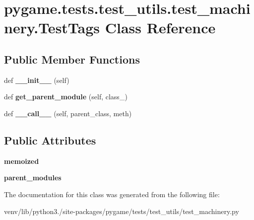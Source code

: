\hypertarget{classpygame_1_1tests_1_1test__utils_1_1test__machinery_1_1_test_tags}{}\section{pygame.\+tests.\+test\+\_\+utils.\+test\+\_\+machinery.\+Test\+Tags Class Reference}
\label{classpygame_1_1tests_1_1test__utils_1_1test__machinery_1_1_test_tags}
\subsection*{Public Member Functions}
\begin{DoxyCompactItemize}
\item 
\mbox{\label{classpygame_1_1tests_1_1test__utils_1_1test__machinery_1_1_test_tags_a28c58f291cf0f58356577d0dc758eddb}} 
def {\bfseries \+\_\+\+\_\+init\+\_\+\+\_\+} (self)
\item 
\mbox{\label{classpygame_1_1tests_1_1test__utils_1_1test__machinery_1_1_test_tags_a688fc9a730cfe9c6c365f7ddff668712}} 
def {\bfseries get\+\_\+parent\+\_\+module} (self, class\+\_\+)
\item 
\mbox{\label{classpygame_1_1tests_1_1test__utils_1_1test__machinery_1_1_test_tags_a5ff73d1561fee249f1628d02fa3d2cb7}} 
def {\bfseries \+\_\+\+\_\+call\+\_\+\+\_\+} (self, parent\+\_\+class, meth)
\end{DoxyCompactItemize}
\subsection*{Public Attributes}
\begin{DoxyCompactItemize}
\item 
\mbox{\label{classpygame_1_1tests_1_1test__utils_1_1test__machinery_1_1_test_tags_a556b10489a5a440b0b2b0f4a94348add}} 
{\bfseries memoized}
\item 
\mbox{\label{classpygame_1_1tests_1_1test__utils_1_1test__machinery_1_1_test_tags_a06731fadb8907d00eeea65e02019dc53}} 
{\bfseries parent\+\_\+modules}
\end{DoxyCompactItemize}


The documentation for this class was generated from the following file\+:\begin{DoxyCompactItemize}
\item 
venv/lib/python3./site-\/packages/pygame/tests/test\+\_\+utils/test\+\_\+machinery.\+py\end{DoxyCompactItemize}
